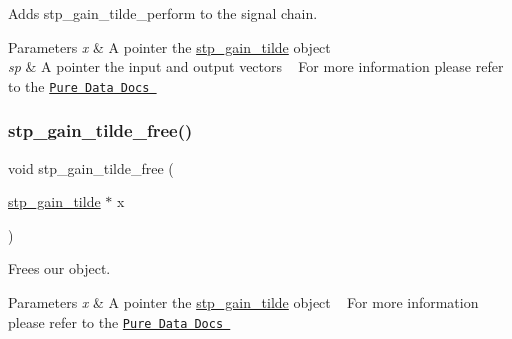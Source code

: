 Adds stp\+\_\+gain\+\_\+tilde\+\_\+perform to the signal chain. ~\newline
 


\begin{DoxyParams}{Parameters}
{\em x} & A pointer the \hyperlink{structstp__gain__tilde}{stp\+\_\+gain\+\_\+tilde} object ~\newline
 \\
\hline
{\em sp} & A pointer the input and output vectors ~\newline
 For more information please refer to the \href{https://github.com/pure-data/externals-howto}{\tt Pure Data Docs } ~\newline
 \\
\hline
\end{DoxyParams}
\mbox{\label{structstp__gain__tilde_ac6dcde965f8cb9e6576179047f7951fe}} 
\subsubsection{\texorpdfstring{stp\+\_\+gain\+\_\+tilde\+\_\+free()}{stp\_gain\_tilde\_free()}}
{\footnotesize\ttfamily void stp\+\_\+gain\+\_\+tilde\+\_\+free (\begin{DoxyParamCaption}\item[{\hyperlink{structstp__gain__tilde}{stp\+\_\+gain\+\_\+tilde} $\ast$}]{x }\end{DoxyParamCaption})\hspace{0.3cm}{\ttfamily [related]}}



Frees our object. ~\newline
 


\begin{DoxyParams}{Parameters}
{\em x} & A pointer the \hyperlink{structstp__gain__tilde}{stp\+\_\+gain\+\_\+tilde} object ~\newline
 For more information please refer to the \href{https://github.com/pure-data/externals-howto}{\tt Pure Data Docs } ~\newline
 \\
\hline
\end{DoxyParams}
\mbox{\label{structstp__gain__tilde_abd7b5011b953f4fe73564886bc67c984}} 
